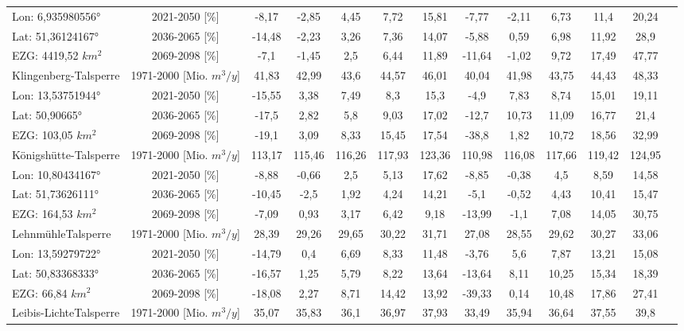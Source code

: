 \begin{longtable}{@{\extracolsep{\fill}}lc|ccccc||cccccc}
\cline{2-13} 
Lon: 6,935980556° & 2021-2050 [\%]  & -8,17 & -2,85 & 4,45 & 7,72 & 15,81 & -7,77 & -2,11 & 6,73 & 11,4 & 20,24 & \\ 
Lat: 51,36124167° & 2036-2065 [\%]  & -14,48 & -2,23 & 3,26 & 7,36 & 14,07 & -5,88 & 0,59 & 6,98 & 11,92 & 28,9 & \\ 
EZG: 4419,52 $km^2$ & 2069-2098 [\%]  & -7,1 & -1,45 & 2,5 & 6,44 & 11,89 & -11,64 & -1,02 & 9,72 & 17,49 & 47,77 & \\ 
\hline 
Klingenberg-Talsperre & 1971-2000 [Mio. $m^3/y$]  & 41,83 & 42,99 & 43,6 & 44,57 & 46,01 & 40,04 & 41,98 & 43,75 & 44,43 & 48,33 & \\ 
\cline{2-13} 
Lon: 13,53751944° & 2021-2050 [\%]  & -15,55 & 3,38 & 7,49 & 8,3 & 15,3 & -4,9 & 7,83 & 8,74 & 15,01 & 19,11 & \\ 
Lat: 50,90665° & 2036-2065 [\%]  & -17,5 & 2,82 & 5,8 & 9,03 & 17,02 & -12,7 & 10,73 & 11,09 & 16,77 & 21,4 & \\ 
EZG: 103,05 $km^2$ & 2069-2098 [\%]  & -19,1 & 3,09 & 8,33 & 15,45 & 17,54 & -38,8 & 1,82 & 10,72 & 18,56 & 32,99 & \\ 
\hline 
Königshütte-Talsperre & 1971-2000 [Mio. $m^3/y$]  & 113,17 & 115,46 & 116,26 & 117,93 & 123,36 & 110,98 & 116,08 & 117,66 & 119,42 & 124,95 & \\ 
\cline{2-13} 
Lon: 10,80434167° & 2021-2050 [\%]  & -8,88 & -0,66 & 2,5 & 5,13 & 17,62 & -8,85 & -0,38 & 4,5 & 8,59 & 14,58 & \\ 
Lat: 51,73626111° & 2036-2065 [\%]  & -10,45 & -2,5 & 1,92 & 4,24 & 14,21 & -5,1 & -0,52 & 4,43 & 10,41 & 15,47 & \\ 
EZG: 164,53 $km^2$ & 2069-2098 [\%]  & -7,09 & 0,93 & 3,17 & 6,42 & 9,18 & -13,99 & -1,1 & 7,08 & 14,05 & 30,75 & \\ 
\hline 
LehnmühleTalsperre & 1971-2000 [Mio. $m^3/y$]  & 28,39 & 29,26 & 29,65 & 30,22 & 31,71 & 27,08 & 28,55 & 29,62 & 30,27 & 33,06 & \\ 
\cline{2-13} 
Lon: 13,59279722° & 2021-2050 [\%]  & -14,79 & 0,4 & 6,69 & 8,33 & 11,48 & -3,76 & 5,6 & 7,87 & 13,21 & 15,08 & \\ 
Lat: 50,83368333° & 2036-2065 [\%]  & -16,57 & 1,25 & 5,79 & 8,22 & 13,64 & -13,64 & 8,11 & 10,25 & 15,34 & 18,39 & \\ 
EZG: 66,84 $km^2$ & 2069-2098 [\%]  & -18,08 & 2,27 & 8,71 & 14,42 & 13,92 & -39,33 & 0,14 & 10,48 & 17,86 & 27,41 & \\ 
\hline 
Leibis-LichteTalsperre & 1971-2000 [Mio. $m^3/y$]  & 35,07 & 35,83 & 36,1 & 36,97 & 37,93 & 33,49 & 35,94 & 36,64 & 37,55 & 39,8 & \\ 

\end{longtable}
